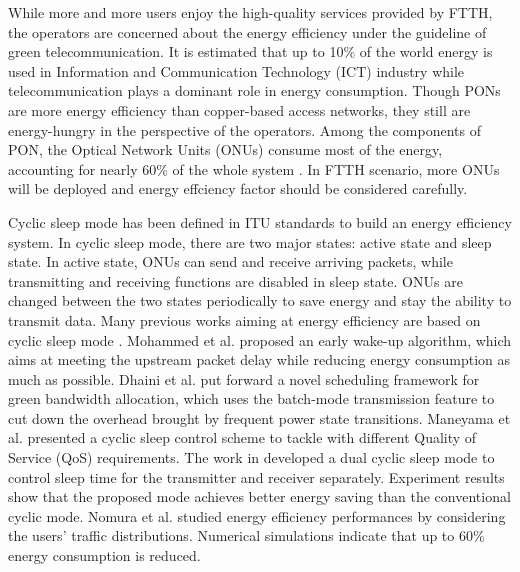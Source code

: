 \documentclass[journal]{IEEEtran}
\begin{document}
While more and more users enjoy the high-quality services provided by FTTH, the operators are concerned about the energy efficiency under the guideline of green telecommunication. It is estimated that up to 10\% of the world energy is used in Information and Communication Technology (ICT) industry while telecommunication plays a dominant role in energy consumption. Though PONs are more energy efficiency than copper-based access networks, they still are energy-hungry in the perspective of the operators. Among the components of PON, the Optical Network Units (ONUs) consume most of the energy, accounting for nearly 60\% of the whole system \cite{kani2013power}. In FTTH scenario, more ONUs will be deployed and energy effciency factor should be considered carefully.

Cyclic sleep mode has been defined in ITU standards to build an energy efficiency system. In cyclic sleep mode, there are two major states: active state and sleep state. In active state, ONUs can send and receive arriving packets, while transmitting and receiving functions are disabled in sleep state. ONUs are changed between the two states periodically to save energy and stay the ability to transmit data. Many previous works aiming at energy efficiency are based on cyclic sleep mode \cite{6375895, 5706311, 5360736, 6069715}. Mohammed et al. \cite{7489960} proposed an early wake-up algorithm, which aims at meeting the upstream packet delay while reducing energy consumption as much as possible. Dhaini et al. \cite{6512637} put forward a novel scheduling framework for green bandwidth allocation, which uses the batch-mode transmission feature to cut down the overhead brought by frequent power state transitions. Maneyama et al. \cite{6954287} presented a cyclic sleep control scheme to tackle with different Quality of Service (QoS) requirements. The work in \cite{kim2014dual} developed a dual cyclic sleep mode to control sleep time for the transmitter and receiver separately. Experiment results show that the proposed mode achieves better energy saving than the conventional cyclic mode. Nomura et al. \cite{nomura2012onu} studied energy efficiency performances by considering the users' traffic distributions. Numerical simulations indicate that up to 60\% energy consumption is reduced.
\end{document}
